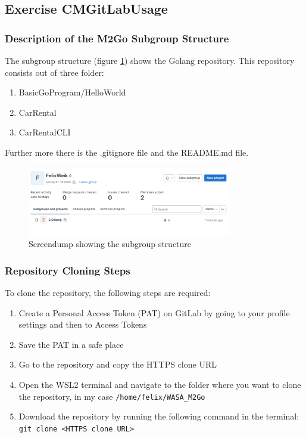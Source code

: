 \label{sec:exercise_cm_gitlab_usage}

\subsection{Exercise CMGitLabUsage}

\subsubsection*{Description of the M2Go Subgroup Structure}
The subgroup structure (figure \ref*{fig:screendump_subgroupStructure}) shows the Golang repository.
This repository consists out of three folder:
\begin{enumerate}
    \item BasicGoProgram/HelloWorld
    \item CarRental
    \item CarRentalCLI
\end{enumerate}
Further more there is the .gitignore file and the README.md file.

\begin{figure}[h]
    \centering
    \includegraphics[width=0.8\textwidth]{figures/goLang/golang_personalSubgroupStructure.png}
    \caption{Screendump showing the subgroup structure}
    \label{fig:screendump_subgroupStructure}
\end{figure}

\subsubsection*{Repository Cloning Steps}
To clone the repository, the following steps are required:
\begin{enumerate}
    \item Create a Personal Access Token (PAT) on GitLab by going to your profile settings and then to Access Tokens
    \item Save the PAT in a safe place
    \item Go to the repository and copy the HTTPS clone URL
    \item Open the WSL2 terminal and navigate to the folder where you want to clone the repository, in my case \texttt{/home/felix/WASA\_M2Go}
    \item Download the repository by running the following command in the terminal: \texttt{git clone <HTTPS clone URL>}
\end{enumerate}

